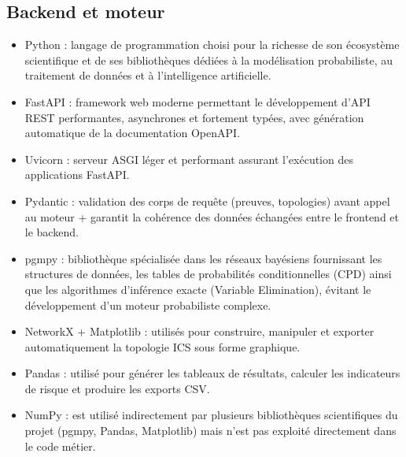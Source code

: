 \documentclass[12pt,a4paper]{article}
\newcommand{\forcereset}[1]{%
    \needspace{#1\baselineskip}%
}
\begin{document}
\subsection{Backend et moteur}
\forcereset{4}
\begin{itemize}[leftmargin=1.2cm, itemsep=0.2\baselineskip]
    \item Python : langage de programmation choisi pour la richesse de son écosystème scientifique et de ses bibliothèques dédiées à la modélisation probabiliste, au traitement de données et à l'intelligence artificielle.
    \item FastAPI : framework web moderne permettant le développement d'API REST performantes, asynchrones et fortement typées, avec génération automatique de la documentation OpenAPI.
    \item Uvicorn : serveur ASGI léger et performant assurant l'exécution des applications FastAPI.
    \item Pydantic : validation des corps de requête (preuves, topologies) avant appel au moteur + garantit la cohérence des données échangées entre le frontend et le backend.
    \item pgmpy : bibliothèque spécialisée dans les réseaux bayésiens fournissant les structures de données, les tables de probabilités conditionnelles (CPD) ainsi que les algorithmes d'inférence exacte (Variable Elimination), évitant le développement d'un moteur probabiliste complexe.
    \item NetworkX + Matplotlib : utilisés pour construire, manipuler et exporter automatiquement la topologie ICS sous forme graphique.
    \item Pandas : utilisé pour générer les tableaux de résultats, calculer les indicateurs de risque et produire les exports CSV.
    \item NumPy : est utilisé indirectement par plusieurs bibliothèques scientifiques du projet (pgmpy, Pandas, Matplotlib) mais n'est pas exploité directement dans le code métier.
\end{itemize}

\newpage
\end{document}
